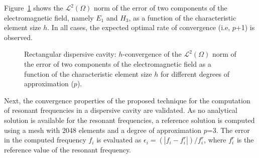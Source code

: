 Figure~\ref{fig:rectangle2DdispersiveTest_Convergence} shows the $\mathcal{L}^2(\Omega)$ norm of the error of two components of the electromagnetic field, namely $E_1$ and $H_3$, as a function of the characteristic element size $h$. In all cases, the expected optimal rate of convergence (i.e, $p$+1) is observed. 
\begin{figure}[!ht]
	\centering
	\caption{Rectangular dispersive cavity: $h$-convergence of the $\mathcal{L}^2(\Omega)$ norm of the error of two components of the electromagnetic field as a function of the characteristic element size $h$ for different degrees of approximation ($p$).}
	\label{fig:rectangle2DdispersiveTest_Convergence}
\end{figure}
Next, the convergence properties of the proposed technique for the computation of resonant frequencies in a dispersive cavity are validated. As no analytical solution is available for the resonant frequencies, a reference solution is computed using a mesh with 2048 elements and a degree of approximation $p$=3.  The error in the computed frequency $f_i$ is evaluated as $\epsilon_i = (|f_i - f_i^r|)/f_i^r$, where $f_i^r$ is the reference value of the resonant frequency.


